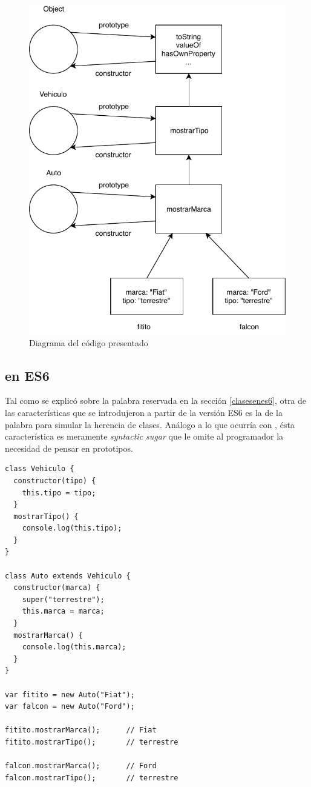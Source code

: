 \begin{figure}[H]
\centering
\includegraphics{Figures/Herencia}
\decoRule
\caption[Herencia prototipada]{Diagrama del código presentado}
\label{fig:herencia}
\end{figure}

\subsection{ en ES6}

Tal como se explicó sobre la palabra reservada  en la sección \ref{clasesenes6}, otra de las características que se introdujeron a partir de la versión ES6 es la de la palabra  para simular la herencia de clases. Análogo a lo que ocurría con , ésta característica es meramente \textit{syntactic sugar} que le omite al programador la necesidad de pensar en prototipos. 

\begin{lstlisting}[title={\code{extends} en ES6}]
class Vehiculo {
  constructor(tipo) {
    this.tipo = tipo;
  }
  mostrarTipo() {
    console.log(this.tipo);
  }
}

class Auto extends Vehiculo {
  constructor(marca) {
    super("terrestre");
    this.marca = marca;
  }
  mostrarMarca() {
    console.log(this.marca);
  }
}

var fitito = new Auto("Fiat");
var falcon = new Auto("Ford");
     
fitito.mostrarMarca();      // Fiat
fitito.mostrarTipo();       // terrestre

falcon.mostrarMarca();      // Ford
falcon.mostrarTipo();       // terrestre
\end{lstlisting}

